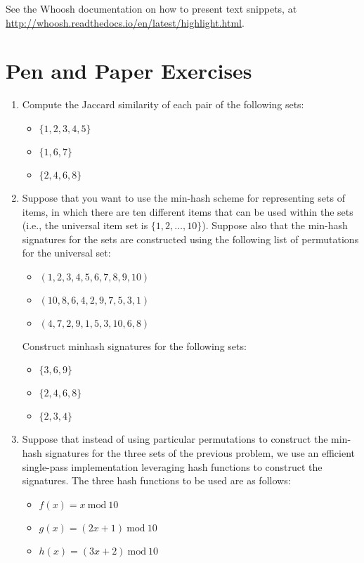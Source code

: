 \documentclass[12pt]{article}
\begin{document}
See the Whoosh documentation on how to present text snippets, at
\url{http://whoosh.readthedocs.io/en/latest/highlight.html}.

\section{Pen and Paper Exercises}

\begin{enumerate}
\item Compute the Jaccard similarity of each pair of the following sets: 

\begin{itemize}
\item $\{1, 2, 3, 4, 5\}$
\item $\{1, 6, 7\}$
\item $\{2, 4, 6, 8\}$
\end{itemize}

\item Suppose that you want to use the min-hash scheme for representing sets of items, in which there are ten different items that can be used within the sets (i.e., the universal item set is $\{ 1, 2, \ldots , 10\}$). Suppose also that the min-hash signatures for the sets are constructed using the following list of permutations for the universal set:

\begin{itemize}
\item $(1,2,3,4,5,6,7,8,9,10)$ 
\item $(10,8,6,4,2,9,7,5,3,1)$ 
\item $(4,7,2,9,1,5,3,10,6,8)$
\end{itemize}

Construct minhash signatures for the following sets: 

\begin{itemize}
\item $\{3,6,9\}$
\item $\{2,4,6,8\}$
\item $\{2,3,4\}$
\end{itemize}

\item Suppose that instead of using particular permutations to construct the min-hash signatures for the three sets of the previous problem, we use an efficient single-pass implementation leveraging hash functions to construct the signatures. The three hash functions to be used are as follows:

\begin{itemize}
\item $f(x)=x ~\mathrm{mod}~ 10 $
\item $g(x)=(2x+1) ~\mathrm{mod}~ 10$
\item $h(x)=(3x+2) ~\mathrm{mod}~ 10$
\end{itemize}


\end{enumerate}
\end{document}
